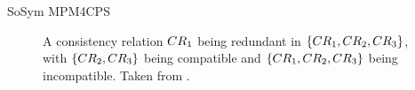 \begin{copiedFrom}{SoSym MPM4CPS}




\begin{figure}
    \centering
    
    \caption{A consistency relation $CR_{1}$ being redundant in  $\{ CR_{1}, CR_{2}, CR_{3} \}$, with $\{ CR_{2}, CR_{3} \}$ being compatible and $\{ CR_{1}, CR_{2},CR_{3} \}$ being incompatible. Taken from .}
    \label{fig:correctness:formal:redundancy_compatibility_counterexample}
\end{figure}


\end{copiedFrom}
